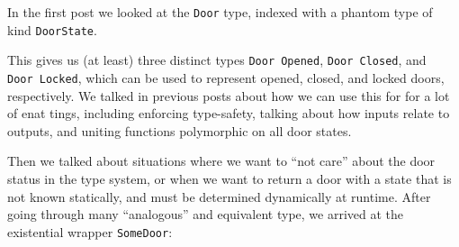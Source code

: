 \documentclass[]{article}
\newenvironment{Shaded}{}{}
\newcommand{\CommentTok}[1]{\textcolor[rgb]{0.38,0.63,0.69}{\textit{#1}}}
\newcommand{\DataTypeTok}[1]{\textcolor[rgb]{0.56,0.13,0.00}{#1}}
\newcommand{\FunctionTok}[1]{\textcolor[rgb]{0.02,0.16,0.49}{#1}}
\newcommand{\KeywordTok}[1]{\textcolor[rgb]{0.00,0.44,0.13}{\textbf{#1}}}
\newcommand{\NormalTok}[1]{#1}
\newcommand{\OtherTok}[1]{\textcolor[rgb]{0.00,0.44,0.13}{#1}}
\begin{document}
In the first post we looked at the \texttt{Door} type, indexed with a phantom
type of kind \texttt{DoorState}.

\begin{Shaded}
\end{Shaded}

This gives us (at least) three distinct types
\texttt{Door\ \textquotesingle{}Opened},
\texttt{Door\ \textquotesingle{}Closed}, and
\texttt{Door\ \textquotesingle{}Locked}, which can be used to represent opened,
closed, and locked doors, respectively. We talked in previous posts about how we
can use this for for a lot of enat tings, including enforcing type-safety,
talking about how inputs relate to outputs, and uniting functions polymorphic on
all door states.

Then we talked about situations where we want to ``not care'' about the door
status in the type system, or when we want to return a door with a state that is
not known statically, and must be determined dynamically at runtime. After going
through many ``analogous'' and equivalent type, we arrived at the existential
wrapper \texttt{SomeDoor}:

\begin{Shaded}
\end{Shaded}
\end{document}
